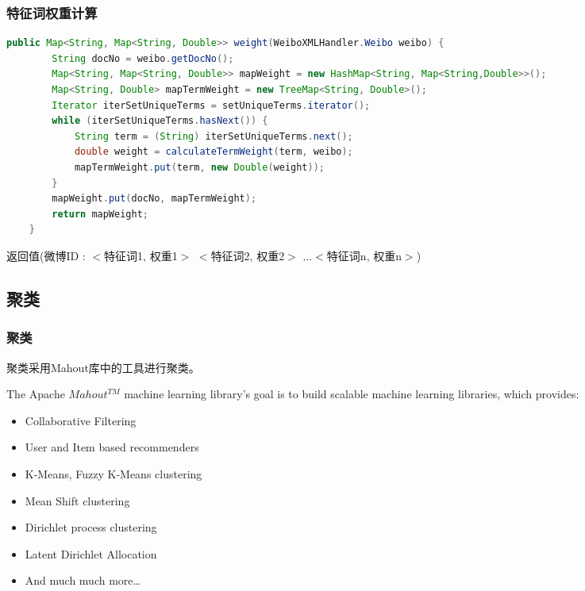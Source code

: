 \documentclass[CJKutf8, table]{beamer}
\begin{document}
\begin{CJK}{UTF8}{gbsn}
\begin{frame}[fragile]
  \frametitle{特征词权重计算}
  \lstset{language=Java,basicstyle=\ttfamily,commentstyle=\ttfamily}
  \begin{tiny}
    \begin{block}{}
      \begin{lstlisting}[language=Java]
    public Map<String, Map<String, Double>> weight(WeiboXMLHandler.Weibo weibo) {
        String docNo = weibo.getDocNo();
        Map<String, Map<String, Double>> mapWeight = new HashMap<String, Map<String,Double>>();
        Map<String, Double> mapTermWeight = new TreeMap<String, Double>();
        Iterator iterSetUniqueTerms = setUniqueTerms.iterator();
        while (iterSetUniqueTerms.hasNext()) {
            String term = (String) iterSetUniqueTerms.next();
            double weight = calculateTermWeight(term, weibo);
            mapTermWeight.put(term, new Double(weight));
        }
        mapWeight.put(docNo, mapTermWeight);
        return mapWeight;
    }
      \end{lstlisting}
    \end{block}
  \end{tiny}
  \pause
  \begin{tiny}
    \begin{block}{}
      返回值(微博ID : $<$特征词1, 权重1$>$ $<$特征词2, 权重2$>$ ...$<$特征词n, 权重n$>$)
    \end{block}
  \end{tiny}
\end{frame}

\subsection{聚类}
\begin{frame}
  \frametitle{聚类}
  \begin{block}{}
    聚类采用Mahout库中的工具进行聚类。
  \end{block}
  \pause
  \begin{block}{}
    The Apache \href{http://mahout.apache.org/}{$Mahout^{TM}$} machine learning library's goal is to build scalable
    machine learning libraries\cite{Mahout}, which provides:
    \begin{center}
    \begin{itemize}
        \item Collaborative Filtering
        \item User and Item based recommenders
        \item K-Means, Fuzzy K-Means clustering
        \item Mean Shift clustering
        \item Dirichlet process clustering
        \item Latent Dirichlet Allocation
        \item And much much more\ldots
      \end{itemize}
    \end{center}
  \end{block}
  

\end{frame}
\end{CJK}
\end{document}
